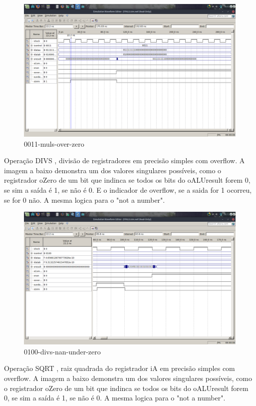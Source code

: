 \documentclass[12pt]{article}
\begin{document}
\begin{figure}[H]
	\centering
	\includegraphics[width=.8\textwidth]{imagens2/0011-muls-over-zero.png}
	\caption{0011-muls-over-zero}
	\label{fig:0011-muls-over-zero}
\end{figure}
Operação DIVS , divisão de registradores em precisão simples com overflow.
A imagem a baixo demonstra um dos valores singulares possíveis, como o registrador oZero de um bit que indinca se todos os bits do oALUresult forem 0, se sim a saída é 1, se não é 0. E o indicador de overflow, se a saida for 1 ocorreu, se for 0 não. A mesma logica para o "not a number".
\begin{figure}[H]
	\centering
	\includegraphics[width=.8\textwidth]{imagens2/0100-divs-nan-under-zero.png}
	\caption{0100-divs-nan-under-zero}
	\label{fig:0100-divs-nan-under-zero}
\end{figure}

Operação SQRT , raiz quadrada do registrador iA em precisão simples com overflow.
A imagem a baixo demonstra um dos valores singulares possíveis, como o registrador oZero de um bit que indinca se todos os bits do oALUresult forem 0, se sim a saída é 1, se não é 0.  A mesma logica para o "not a number".
\end{document}
